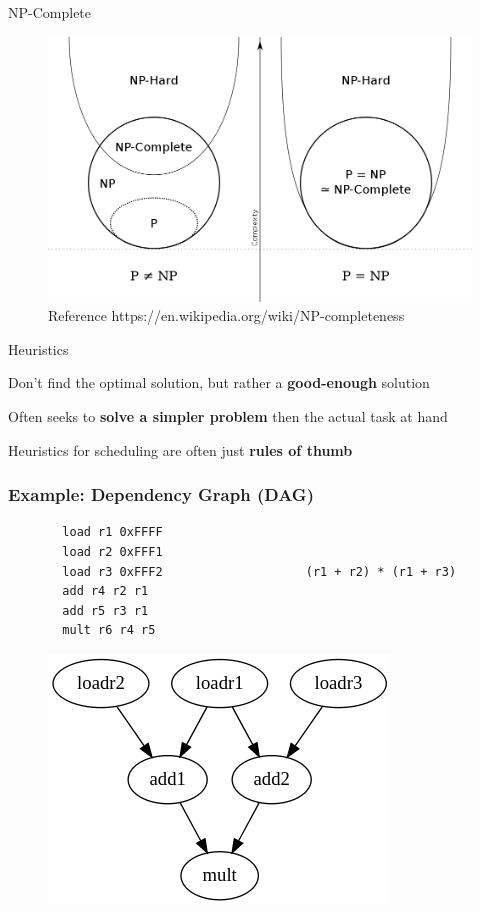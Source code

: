 \documentclass{beamer}
\begin{document}
\begin{darkframes}
\begin{frame}{NP-Complete}
  \begin{figure}
    \includegraphics[scale=0.3]{figures/npcomplete}
    \caption{Reference https://en.wikipedia.org/wiki/NP-completeness}
  \end{figure}
\end{frame}

\begin{frame}{Heuristics}

  \begin{item}
  \item Don't find the optimal solution, but rather a {\bf \color{green}
      good-enough} solution
  \item Often seeks to {\bf \color{green} solve a simpler problem} then the
    actual task at hand
  \item Heuristics for scheduling are often just {\bf \color{green} rules of thumb}
  \end{item}
\end{frame}

\begin{frame}[fragile]
  \frametitle{Example: Dependency Graph (DAG)}

  \begin{figure}
  \begin{lstlisting}
  load r1 0xFFFF
  load r2 0xFFF1
  load r3 0xFFF2                    (r1 + r2) * (r1 + r3)
  add r4 r2 r1
  add r5 r3 r1
  mult r6 r4 r5
  \end{lstlisting} 
    \includegraphics[scale=0.3]{figures/depgraph.png}
  \end{figure}
\end{frame}


\end{darkframes}
\end{document}
